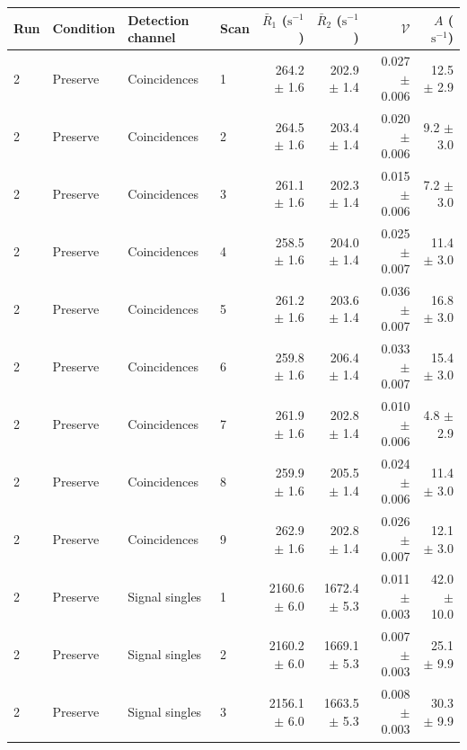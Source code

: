 \begin{tabular}{llllrrrr}
\toprule
Run & Condition & Detection channel & Scan & $\bar R_1$ ($\mathrm{s}^{-1}$) & $\bar R_2$ ($\mathrm{s}^{-1}$) & $\mathcal{V}$ & $A$ ($\mathrm{s}^{-1}$) \\
\midrule
2 & Preserve & Coincidences & 1 & 264.2 \ensuremath{\pm} 1.6 & 202.9 \ensuremath{\pm} 1.4 & 0.027 \ensuremath{\pm} 0.006 & 12.5 \ensuremath{\pm} 2.9 \\
2 & Preserve & Coincidences & 2 & 264.5 \ensuremath{\pm} 1.6 & 203.4 \ensuremath{\pm} 1.4 & 0.020 \ensuremath{\pm} 0.006 & 9.2 \ensuremath{\pm} 3.0 \\
2 & Preserve & Coincidences & 3 & 261.1 \ensuremath{\pm} 1.6 & 202.3 \ensuremath{\pm} 1.4 & 0.015 \ensuremath{\pm} 0.006 & 7.2 \ensuremath{\pm} 3.0 \\
2 & Preserve & Coincidences & 4 & 258.5 \ensuremath{\pm} 1.6 & 204.0 \ensuremath{\pm} 1.4 & 0.025 \ensuremath{\pm} 0.007 & 11.4 \ensuremath{\pm} 3.0 \\
2 & Preserve & Coincidences & 5 & 261.2 \ensuremath{\pm} 1.6 & 203.6 \ensuremath{\pm} 1.4 & 0.036 \ensuremath{\pm} 0.007 & 16.8 \ensuremath{\pm} 3.0 \\
2 & Preserve & Coincidences & 6 & 259.8 \ensuremath{\pm} 1.6 & 206.4 \ensuremath{\pm} 1.4 & 0.033 \ensuremath{\pm} 0.007 & 15.4 \ensuremath{\pm} 3.0 \\
2 & Preserve & Coincidences & 7 & 261.9 \ensuremath{\pm} 1.6 & 202.8 \ensuremath{\pm} 1.4 & 0.010 \ensuremath{\pm} 0.006 & 4.8 \ensuremath{\pm} 2.9 \\
2 & Preserve & Coincidences & 8 & 259.9 \ensuremath{\pm} 1.6 & 205.5 \ensuremath{\pm} 1.4 & 0.024 \ensuremath{\pm} 0.006 & 11.4 \ensuremath{\pm} 3.0 \\
2 & Preserve & Coincidences & 9 & 262.9 \ensuremath{\pm} 1.6 & 202.8 \ensuremath{\pm} 1.4 & 0.026 \ensuremath{\pm} 0.007 & 12.1 \ensuremath{\pm} 3.0 \\
\midrule
2 & Preserve & Signal singles & 1 & 2160.6 \ensuremath{\pm} 6.0 & 1672.4 \ensuremath{\pm} 5.3 & 0.011 \ensuremath{\pm} 0.003 & 42.0 \ensuremath{\pm} 10.0 \\
2 & Preserve & Signal singles & 2 & 2160.2 \ensuremath{\pm} 6.0 & 1669.1 \ensuremath{\pm} 5.3 & 0.007 \ensuremath{\pm} 0.003 & 25.1 \ensuremath{\pm} 9.9 \\
2 & Preserve & Signal singles & 3 & 2156.1 \ensuremath{\pm} 6.0 & 1663.5 \ensuremath{\pm} 5.3 & 0.008 \ensuremath{\pm} 0.003 & 30.3 \ensuremath{\pm} 9.9 \\

\end{tabular}
